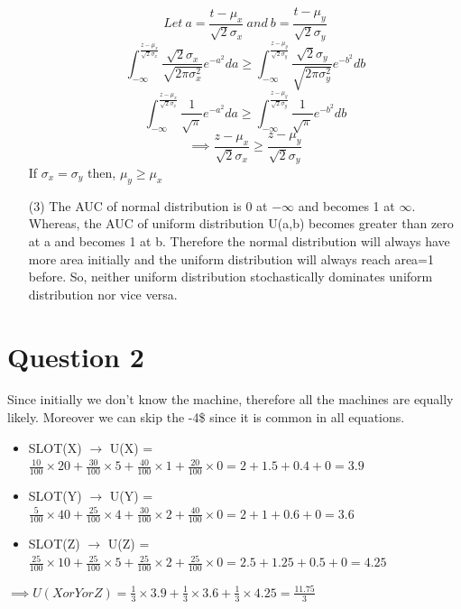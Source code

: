 \documentclass[letter, 10pt]{article}
\begin{document}
\begin{itemize}
    \begin{equation*}
        Let\ a = \frac{t-\mu_x}{\sqrt{2}\sigma_x}\ and\ b = \frac{t-\mu_y}{\sqrt{2}\sigma_y}
    \end{equation*}
    \begin{equation*}
        \int_{-\infty}^{\frac{z-\mu_x}{\sqrt{2}\sigma_x}} \frac{\sqrt{2}\sigma_x}{\sqrt{2\pi\sigma_x^2}}e^{-a^2}da \geq \int_{-\infty}^{\frac{z-\mu_y}{\sqrt{2}\sigma_y}} \frac{\sqrt{2}\sigma_y}{\sqrt{2\pi\sigma_y^2}}e^{-b^2}db
    \end{equation*}
    \begin{equation*}
        \int_{-\infty}^{\frac{z-\mu_x}{\sqrt{2}\sigma_x}} \frac{1}{\sqrt{\pi}}e^{-a^2}da \geq \int_{-\infty}^{\frac{z-\mu_y}{\sqrt{2}\sigma_y}} \frac{1}{\sqrt{\pi}}e^{-b^2}db
    \end{equation*}
    \begin{equation*}
        \implies \frac{z-\mu_x}{\sqrt{2}\sigma_x} \geq \frac{z-\mu_y}{\sqrt{2}\sigma_y}
    \end{equation*}
    If $\sigma_x=\sigma_y$ then, $\mu_y\geq\mu_x$
    \item[(3)] The AUC of normal distribution is 0 at $-\infty$ and becomes 1 at $\infty$. Whereas, the AUC of uniform distribution U(a,b) becomes greater than zero at a and becomes 1 at b. Therefore the normal distribution will always have more area initially and the uniform distribution will always reach area=1 before. So, neither uniform distribution stochastically dominates uniform distribution nor vice versa.
\end{itemize}

\newpage

\section*{Question 2}
Since initially we don't know the machine, therefore all the machines are equally likely. Moreover we can skip the -4\$ since it is common in all equations.
\begin{itemize}
    \item SLOT(X) $\rightarrow$ U(X) = $\frac{10}{100}\times20+\frac{30}{100}\times5+\frac{40}{100}\times1+\frac{20}{100}\times0 = 2+1.5+0.4+0 = 3.9$
    \item SLOT(Y) $\rightarrow$ U(Y) = $\frac{5}{100}\times40+\frac{25}{100}\times4+\frac{30}{100}\times2+\frac{40}{100}\times0 = 2+1+0.6+0 = 3.6$
    \item SLOT(Z) $\rightarrow$ U(Z) = $\frac{25}{100}\times10+\frac{25}{100}\times5+\frac{25}{100}\times2+\frac{25}{100}\times0 = 2.5+1.25+0.5+0 = 4.25$
\end{itemize}
$\implies U(X or Y or Z) = \frac{1}{3}\times3.9+\frac{1}{3}\times3.6+\frac{1}{3}\times4.25 = \frac{11.75}{3}$\\
\end{document}
